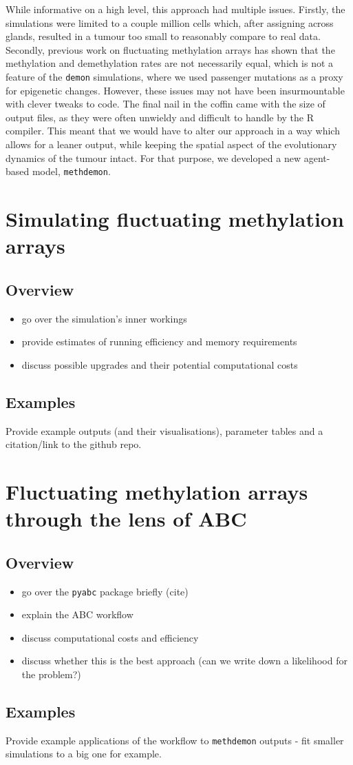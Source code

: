While informative on a high level, this approach had multiple issues. Firstly, the simulations were
limited to a couple million cells which, after assigning across glands, resulted in a tumour too small
to reasonably compare to real data. Secondly, previous work on fluctuating methylation arrays
\cite{gabbutt_fluctuating_2022, gabbutt_evolutionary_2023} has shown that the methylation and demethylation
rates are not necessarily equal, which is not a feature of the \texttt{demon} simulations, where we used
passenger mutations as a proxy for epigenetic changes. However, these issues may not have been insurmountable
with clever tweaks to code. The final nail in the coffin came with the size of output files, as they were often
unwieldy and difficult to handle by the R compiler. This meant that we would have to alter our approach in a way
which allows for a leaner output, while keeping the spatial aspect of the evolutionary dynamics of the tumour intact.
For that purpose, we developed a new agent-based model, \texttt{methdemon}.


\section{Simulating fluctuating methylation arrays}\label{section:methdemon}
\subsection{Overview}
\begin{itemize}
    \item go over the simulation's inner workings
    \item provide estimates of running efficiency and memory requirements
    \item discuss possible upgrades and their potential computational costs
\end{itemize}
\subsection{Examples}
Provide example outputs (and their visualisations), parameter tables and a citation/link to the github repo.

\section{Fluctuating methylation arrays through the lens of ABC}\label{section:methabc}
\subsection{Overview}
\begin{itemize}
    \item go over the \texttt{pyabc} package briefly (cite)
    \item explain the ABC workflow
    \item discuss computational costs and efficiency
    \item discuss whether this is the best approach (can we write down a likelihood for the problem?)
\end{itemize}
\subsection{Examples}
Provide example applications of the workflow to \texttt{methdemon} outputs - fit smaller simulations to a big one for example.
